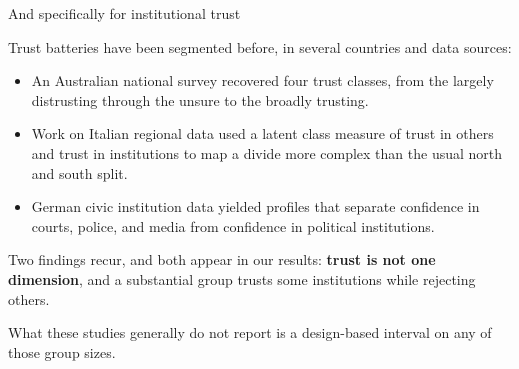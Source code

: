 \documentclass[
  ignorenonframetext,
  aspectratio=169,
]{beamer}
\newcommand{\kicker}[1]{\par\noindent{\footnotesize\color{vteal}\textbf{\MakeUppercase{#1}}}\par\vspace{0.4em}}
\begin{document}
\begin{frame}[shrink]{And specifically for institutional trust}
\label{and-specifically-for-institutional-trust}
\kicker{prior typologies}

\small

Trust batteries have been segmented before, in several countries and
data sources:

\vspace{0.5em}

\begin{itemize}\itemsep4pt
  \item An Australian national survey recovered four trust classes, from the largely distrusting through the unsure to the broadly trusting.
  \item Work on Italian regional data used a latent class measure of trust in others and trust in institutions to map a divide more complex than the usual north and south split.
  \item German civic institution data yielded profiles that separate confidence in courts, police, and media from confidence in political institutions.
\end{itemize}

\vspace{0.6em}

Two findings recur, and both appear in our results: \textbf{trust is not
one dimension}, and a substantial group trusts some institutions while
rejecting others.

\vspace{0.4em}

\begin{center}
\small What these studies generally do not report is a design-based interval on any of those group sizes.
\end{center}

\end{frame}
\end{document}
